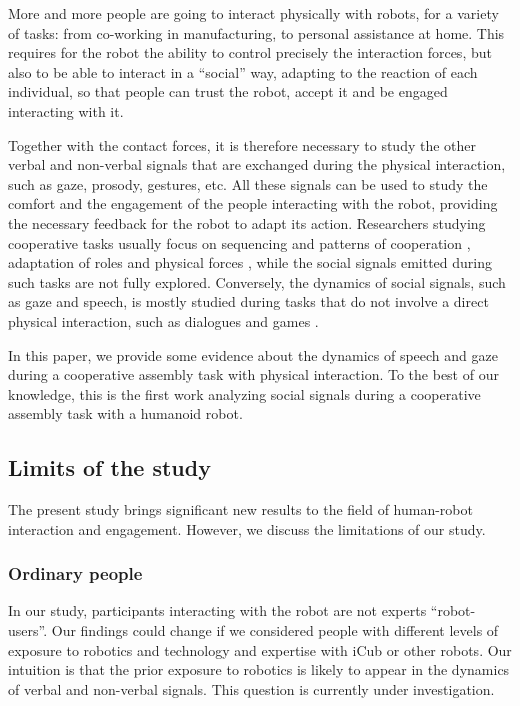 \documentclass[twocolumn]{svjour3}          %
\begin{document}
More and more people are going to interact physically with robots, for a variety of tasks: from co-working in manufacturing, to personal assistance at home.
This requires for the robot the ability to control precisely the interaction forces, but also to be able to interact in a ``social'' way, adapting to the reaction of each individual, so that people can trust the robot, accept it and be engaged interacting with it. 


Together with the contact forces, it is therefore necessary to study the other verbal and non-verbal signals that are exchanged during the physical interaction, such as gaze, prosody, gestures, etc.
All these signals can be used to study the comfort and the engagement of the people interacting with the robot, providing the necessary feedback for the robot to adapt its action.
Researchers studying cooperative tasks usually focus on sequencing and patterns of cooperation \cite{Wilcox2012}, adaptation of roles and physical forces \cite{Stefanov2009}, while the social signals emitted during such tasks are not fully explored.
Conversely, the dynamics of social signals, such as gaze and speech, is mostly studied during tasks that do not involve a direct physical interaction, such as dialogues and games \cite{Boucenna2014,Anzalone2015engagement,Castellano2009}.

In this paper, we provide some evidence about the dynamics of speech and gaze during a cooperative assembly task with physical interaction. To the best of our knowledge, this is the first work analyzing social signals during a cooperative assembly task with a humanoid robot.






\subsection{Limits of the study}

The present study brings significant new results to the field of human-robot interaction and engagement. However, we discuss the limitations of our study.

\subsubsection{Ordinary people}

In our study, participants interacting with the robot are not experts ``robot-users''. Our findings could change if we considered people with different levels of exposure to robotics and technology and expertise with iCub or other robots. 
Our intuition is that the prior exposure to robotics is likely to appear in the dynamics of verbal and non-verbal signals.
This question is currently under investigation.
\end{document}
